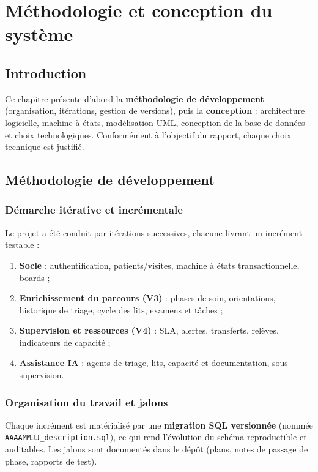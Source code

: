 \chapter{Méthodologie et conception du système}

\section{Introduction}

Ce chapitre présente d'abord la \textbf{méthodologie de développement} (organisation, itérations, gestion de versions), puis la \textbf{conception} : architecture logicielle, machine à états, modélisation UML, conception de la base de données et choix technologiques. Conformément à l'objectif du rapport, chaque choix technique est justifié.

\section{Méthodologie de développement}

\subsection{Démarche itérative et incrémentale}

Le projet a été conduit par itérations successives, chacune livrant un incrément testable :

\begin{enumerate}
    \item \textbf{Socle} : authentification, patients/visites, machine à états transactionnelle, boards ;
    \item \textbf{Enrichissement du parcours (V3)} : phases de soin, orientations, historique de triage, cycle des lits, examens et tâches ;
    \item \textbf{Supervision et ressources (V4)} : SLA, alertes, transferts, relèves, indicateurs de capacité ;
    \item \textbf{Assistance IA} : agents de triage, lits, capacité et documentation, sous supervision.
\end{enumerate}

\subsection{Organisation du travail et jalons}

Chaque incrément est matérialisé par une \textbf{migration SQL versionnée} (nommée \texttt{AAAAMMJJ\_description.sql}), ce qui rend l'évolution du schéma reproductible et auditables. Les jalons sont documentés dans le dépôt (plans, notes de passage de phase, rapports de test).


